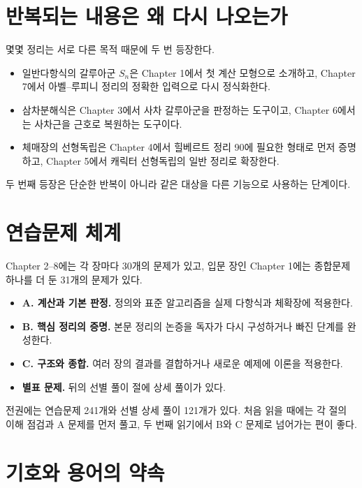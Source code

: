 \section*{반복되는 내용은 왜 다시 나오는가}

몇몇 정리는 서로 다른 목적 때문에 두 번 등장한다.
\begin{itemize}
  \item 일반다항식의 갈루아군 $S_n$은 Chapter 1에서 첫 계산 모형으로 소개하고, Chapter 7에서 아벨--루피니 정리의 정확한 입력으로 다시 정식화한다.
  \item 삼차분해식은 Chapter 3에서 사차 갈루아군을 판정하는 도구이고, Chapter 6에서는 사차근을 근호로 복원하는 도구이다.
  \item 체매장의 선형독립은 Chapter 4에서 힐베르트 정리 90에 필요한 형태로 먼저 증명하고, Chapter 5에서 캐릭터 선형독립의 일반 정리로 확장한다.
\end{itemize}
두 번째 등장은 단순한 반복이 아니라 같은 대상을 다른 기능으로 사용하는 단계이다.

\section*{연습문제 체계}

Chapter 2--8에는 각 장마다 30개의 문제가 있고, 입문 장인 Chapter 1에는 종합문제 하나를 더 둔 31개의 문제가 있다.
\begin{itemize}
  \item \textbf{A. 계산과 기본 판정.}
  정의와 표준 알고리즘을 실제 다항식과 체확장에 적용한다.
  \item \textbf{B. 핵심 정리의 증명.}
  본문 정리의 논증을 독자가 다시 구성하거나 빠진 단계를 완성한다.
  \item \textbf{C. 구조와 종합.}
  여러 장의 결과를 결합하거나 새로운 예제에 이론을 적용한다.
  \item \textbf{별표 문제.}
  뒤의 선별 풀이 절에 상세 풀이가 있다.
\end{itemize}
전권에는 연습문제 241개와 선별 상세 풀이 121개가 있다. 처음 읽을 때에는 각 절의 이해 점검과 A 문제를 먼저 풀고, 두 번째 읽기에서 B와 C 문제로 넘어가는 편이 좋다.

\section*{기호와 용어의 약속}

